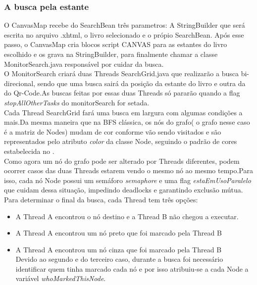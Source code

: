 \documentclass[a4paper,10pt]{article}
\begin{document}
	\subsubsection{A busca pela estante}

	O CanvasMap recebe do SearchBean três parametros: A StringBuilder que será escrita no arquivo .xhtml, o livro selecionado e o própio SearchBean.
	Após esse passo, o CanvasMap cria blocos script CANVAS para as estantes do livro escolhido e os grava na StringBuilder, para
	finalmente chamar a classe MonitorSearch.java responsável por cuidar da busca.\\

	O MonitorSearch criará duas Threads SearchGrid.java que realizarão a busca bi-direcional, sendo que uma busca sairá da posição da estante
	do livro e outra da do Qr-Code.As buscas feitas por essas duas Threads só pararão quando a flag {\it stopAllOtherTasks} do
	 monitorSearch for setada.\\

	Cada Thread SearchGrid fará uma busca em largura com algumas condições a mais.Da mesma maneira que na BFS clássica, os
	nós do grafo( o grafo nesse caso é a matriz de Nodes) mudam de cor conforme vão sendo visitados e são representados pelo atributo
	{\it color} da classe Node, seguindo o padrão de cores estabelecida no 	\cite{bidirecional}.\\

	Como agora um nó do grafo pode ser alterado por Threads diferentes, podem ocorrer casos das duas Threads estarem vendo o mesmo nó
	ao mesmo tempo.Para isso, cada nó Node possui um semáforo  {\it semaphore} e uma flag {\it estaEmUsoParalelo} que cuidam dessa situação,
	impedindo deadlocks e garantindo exclusão mútua.\\

	Para determinar o final da busca, cada Thread tem três opções:

	\begin{itemize}	
		\item{ A Thread A encontrou o nó destino e a Thread B não chegou a executar.}
		\item{ A Thread A encontrou um nó preto que foi marcado pela Thread B }
		\item{ A Thread A encontrou um nó cinza que foi marcado pela Thread B }\\

			Devido ao segundo e do terceiro caso, durante a busca foi necessário identificar quem tinha marcado cada nó e 
	por isso atribuiu-se a cada Node a variável {\it whoMarkedThisNode}.

	
	\end{itemize}
	
\end{document}
